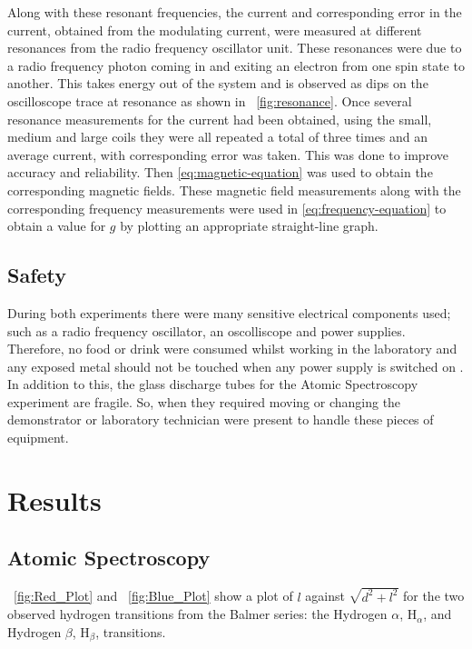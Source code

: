 \documentclass{article}
\newcommand{\figref}[2][\figurename~]{#1\ref{#2}}
\begin{document}
\vspace{2mm}
\noindent
Along with these resonant frequencies, the current and corresponding error in the current, obtained from the modulating current, were measured at different resonances from the radio frequency oscillator unit. These resonances were due to a radio frequency photon coming in and exiting an electron from one spin state to another. This takes energy out of the system and is observed as dips on the oscilloscope trace at resonance as shown in \figref{fig:resonance}. Once several resonance measurements for the current had been obtained, using the small, medium and large coils they were all repeated a total of three times and an average current, with corresponding error was taken. This was done to improve accuracy and reliability. Then \eqref{eq:magnetic-equation} was used to obtain the corresponding magnetic fields. These magnetic field measurements along with the corresponding frequency measurements were used in \eqref{eq:frequency-equation} to obtain a value for $g$ by plotting an appropriate straight-line graph. 


\subsection{Safety}
\label{ssec:safety}
During both experiments there were many sensitive electrical components used; such as a radio frequency oscillator, an oscolliscope and power supplies. Therefore, no food or drink were consumed whilst working in the laboratory and any exposed metal should not be touched when any power supply is switched on \cite{Paper01}. In addition to this,  the glass discharge tubes for the Atomic Spectroscopy experiment are fragile. So, when they required moving or changing the demonstrator or laboratory technician were present to handle these pieces of equipment. 


\section{Results}
\label{sec:results}

\subsection{Atomic Spectroscopy}
\label{ssec:atomic-results}

\figref{fig:Red_Plot} and \figref{fig:Blue_Plot} show a plot of $l$ against $\sqrt{d^2+l^2}$ for the two observed hydrogen transitions from the Balmer series: the Hydrogen $\alpha$, H$_\alpha$, and Hydrogen $\beta$, H$_\beta$, transitions.
\end{document}

